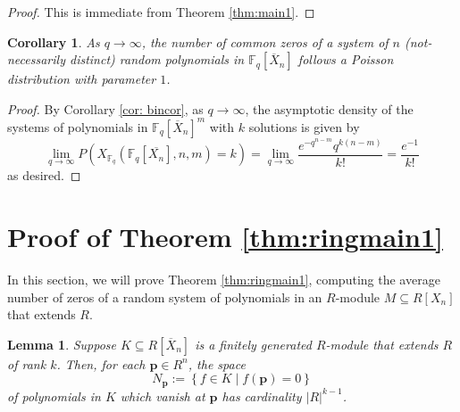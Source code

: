 \documentclass[12pt]{amsart}
\newtheorem{corollary}[theorem]{Corollary}
\newtheorem{lemma}[theorem]{Lemma}
\theoremstyle{definition}
\newcommand{\FF}{\mathbb{F} }
\newcommand{\bp}{\mathbf{p} }
\begin{document}
\begin{proof}
This is immediate from Theorem \ref{thm:main1}.
\end{proof}

\begin{corollary}\label{cor:poisson}
As $q \to \infty$, the number of common zeros of a system of $n$ (not-necessarily distinct) random polynomials in $\FF_q[\overline{X}_n]$ follows a Poisson distribution with parameter $1$.
\end{corollary}

\begin{proof}
By Corollary \ref{cor: bincor}, as $q \to \infty$, the asymptotic density of the systems of polynomials in $\FF_q[\overline{X}_n]^m$ with $k$ solutions is given by
\[
\lim_{q \to \infty} P\left( X_{\FF_{q}}(\FF_{q}[\overline{X_n}], n, m) = k  \right) = \lim_{q \to \infty} \frac{e^{-q^{n-m}}q^{k(n-m)}}{k!} = \frac{e^{-1}}{k!}
\]
as desired.
\end{proof}

\section{Proof of Theorem \ref{thm:ringmain1}}\label{sec:ringsec}

In this section, we will prove Theorem \ref{thm:ringmain1}, computing the average number of zeros of a random system of polynomials in an $R$-module $M \subseteq R[X_n]$ that extends $R$. 

\begin{lemma}\label{lem: Np}
Suppose $K \subseteq  R[\overline{X}_n]$ is a finitely generated $R$-module that extends $R$ of rank $k$. Then, for each $\bp \in R^n$, the space
\[
N_\bp := \left\{ f \in K \mid f(\bp) = 0 \right\}
\]
of polynomials in $K$ which vanish at $\bp$ has cardinality $|R|^{k - 1}$. 
\end{lemma}
\end{document}

